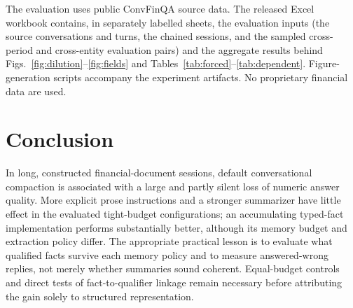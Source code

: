 \documentclass[conference,a4paper]{IEEEtran}
\begin{document}
The evaluation uses public ConvFinQA source data. The released Excel workbook contains, in separately labelled sheets, the evaluation inputs (the source conversations and turns, the chained sessions, and the sampled cross-period and cross-entity evaluation pairs) and the aggregate results behind Figs.~\ref{fig:dilution}--\ref{fig:fields} and Tables~\ref{tab:forced}--\ref{tab:dependent}. Figure-generation scripts accompany the experiment artifacts. No proprietary financial data are used.

\section{Conclusion}

In long, constructed financial-document sessions, default conversational compaction is associated with a large and partly silent loss of numeric answer quality. More explicit prose instructions and a stronger summarizer have little effect in the evaluated tight-budget configurations; an accumulating typed-fact implementation performs substantially better, although its memory budget and extraction policy differ. The appropriate practical lesson is to evaluate what qualified facts survive each memory policy and to measure answered-wrong replies, not merely whether summaries sound coherent. Equal-budget controls and direct tests of fact-to-qualifier linkage remain necessary before attributing the gain solely to structured representation.
\end{document}
